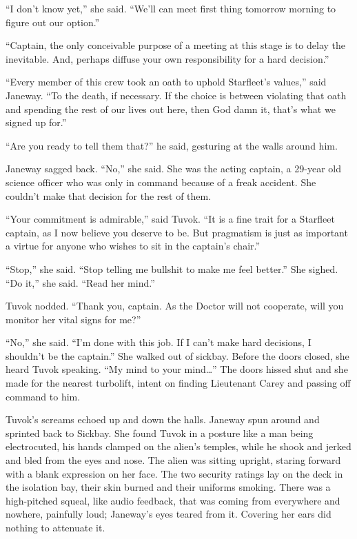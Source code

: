 \documentclass[twoside,letterpaper,12pt]{memoir}
\begin{document}
``I don't know yet,'' she said. ``We'll can meet first thing tomorrow morning to figure out our option.'' 

``Captain, the only conceivable purpose of a meeting at this stage is to delay the inevitable. And, perhaps diffuse your own responsibility for a hard decision.'' 

``Every member of this crew took an oath to uphold Starfleet's values,'' said Janeway. ``To the death, if necessary. If the choice is between violating that oath and spending the rest of our lives out here, then God damn it, that's what we signed up for.'' 

``Are you ready to tell them that?'' he said, gesturing at the walls around him. 

Janeway sagged back. ``No,'' she said. She was the acting captain, a 29-year old science officer who was only in command because of a freak accident. She couldn't make that decision for the rest of them. 

``Your commitment is admirable,'' said Tuvok. ``It is a fine trait for a Starfleet captain, as I now believe you deserve to be. But pragmatism is just as important a virtue for anyone who wishes to sit in the captain's chair.'' 

``Stop,'' she said. ``Stop telling me bullshit to make me feel better.'' She sighed. ``Do it,'' she said. ``Read her mind.'' 

Tuvok nodded. ``Thank you, captain. As the Doctor will not cooperate, will you monitor her vital signs for me?'' 

``No,'' she said. ``I'm done with this job. If I can't make hard decisions, I shouldn't be the captain.'' She walked out of sickbay. Before the doors closed, she heard Tuvok speaking. ``My mind to your mind\ldots '' The doors hissed shut and she made for the nearest turbolift, intent on finding Lieutenant Carey and passing off command to him. 

Tuvok's screams echoed up and down the halls. Janeway spun around and sprinted back to Sickbay. She found Tuvok in a posture like a man being electrocuted, his hands clamped on the alien's temples, while he shook and jerked and bled from the eyes and nose. The alien was sitting upright, staring forward with a blank expression on her face. The two security ratings lay on the deck in the isolation bay, their skin burned and their uniforms smoking. There was a high-pitched squeal, like audio feedback, that was coming from everywhere and nowhere, painfully loud; Janeway's eyes teared from it. Covering her ears did nothing to attenuate it. 
\end{document}

